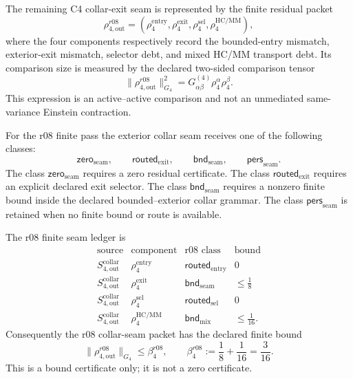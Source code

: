 \begin{definition}
\label{def:v470-r08-collar-seam-residual-packet}
The remaining C4 collar-exit seam is represented by the finite residual packet
\[
\rho_{4,\mathrm{out}}^{r08}
=
(\rho_{4}^{\mathrm{entry}},
 \rho_{4}^{\mathrm{exit}},
 \rho_{4}^{\mathrm{sel}},
 \rho_{4}^{\mathrm{HC/MM}}),
\]
where the four components respectively record the bounded-entry mismatch,
exterior-exit mismatch, selector debt, and mixed HC/MM transport debt.  Its
comparison size is measured by the declared two-sided comparison tensor
\[
\|\rho_{4,\mathrm{out}}^{r08}\|_{G_4}^2
=
G^{(4)}_{\alpha\beta}\rho_4^\alpha\rho_4^\beta .
\]
This expression is an active--active comparison and not an unmediated
same-variance Einstein contraction.
\end{definition}

\begin{definition}
\label{def:v470-r08-collar-seam-bound-classes}
For the r08 finite pass the exterior collar seam receives one of the following
classes:
\[
\mathsf{zero}_{\mathrm{seam}},\qquad
\mathsf{routed}_{\mathrm{exit}},\qquad
\mathsf{bnd}_{\mathrm{seam}},\qquad
\mathsf{pers}_{\mathrm{seam}}.
\]
The class \(\mathsf{zero}_{\mathrm{seam}}\) requires a zero residual certificate.
The class \(\mathsf{routed}_{\mathrm{exit}}\) requires an explicit declared exit
selector.  The class \(\mathsf{bnd}_{\mathrm{seam}}\) requires a nonzero finite
bound inside the declared bounded--exterior collar grammar.  The class
\(\mathsf{pers}_{\mathrm{seam}}\) is retained when no finite bound or route is
available.
\end{definition}

\begin{definition}
\label{def:v470-r08-finite-collar-seam-ledger}
The r08 finite seam ledger is
\[
\begin{array}{c|c|c|c}
\text{source} & \text{component} & \text{r08 class} & \text{bound}\\
\hline
S_{4,\mathrm{out}}^{\mathrm{collar}} & \rho_{4}^{\mathrm{entry}} & \mathsf{routed}_{\mathrm{entry}} & 0\\
S_{4,\mathrm{out}}^{\mathrm{collar}} & \rho_{4}^{\mathrm{exit}} & \mathsf{bnd}_{\mathrm{seam}} & \leq \tfrac18\\
S_{4,\mathrm{out}}^{\mathrm{collar}} & \rho_{4}^{\mathrm{sel}} & \mathsf{routed}_{\mathrm{sel}} & 0\\
S_{4,\mathrm{out}}^{\mathrm{collar}} & \rho_{4}^{\mathrm{HC/MM}} & \mathsf{bnd}_{\mathrm{mix}} & \leq \tfrac1{16}.
\end{array}
\]
Consequently the r08 collar-seam packet has the declared finite bound
\[
\|\rho_{4,\mathrm{out}}^{r08}\|_{G_4}
\leq
\beta_4^{r08},
\qquad
\beta_4^{r08}:=\frac18+\frac1{16}=\frac3{16}.
\]
This is a bound certificate only; it is not a zero certificate.
\end{definition}

